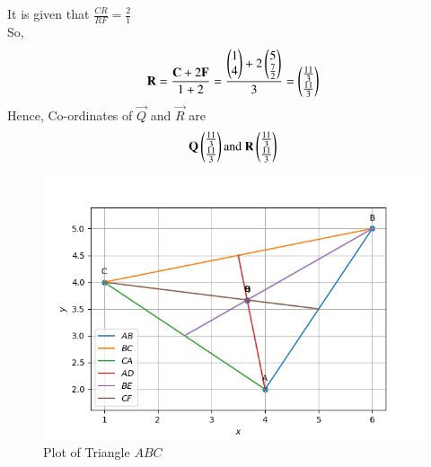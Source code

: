 \documentclass[journal]{IEEEtran}
\numberwithin{equation}{enumi}
\numberwithin{figure}{enumi}
\begin{document}
It is given that $\frac{CR}{RF}=\frac{2}{1}$\\
So,\\
\begin{align}
	\mathbf{R}=\frac{\mathbf{C}+2\mathbf{F}}{1+2}=\frac{\begin{pmatrix}1\\4\end{pmatrix} + 2\begin{pmatrix}5\\\frac{7}{2}\end{pmatrix}}{3}=\begin{pmatrix}\frac{11}{3}\\ \frac{11}{3}\end{pmatrix}
\end{align}
Hence, Co-ordinates of $\vec{Q}$ and $\vec{R}$ are\\
\begin{align}
    \vec{Q}\myvec{\frac{11}{3} \\ \frac{11}{3}} \text{and}\ \vec{R}\myvec{\frac{11}{3} \\ \frac{11}{3}}
\end{align}
\begin{figure}[h!]
   \centering
   \includegraphics[width=0.7\linewidth]{Figure_1.png}
   \caption{Plot of Triangle $ABC$}
   \label{stemplot}
\end{figure}
\end{document}
